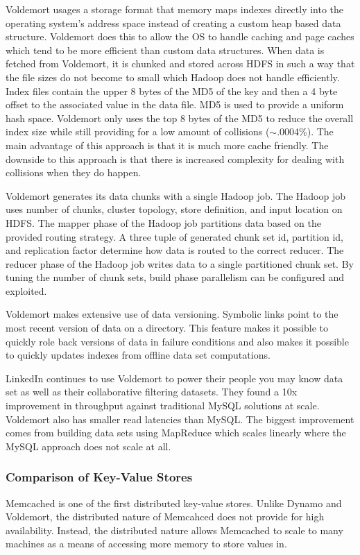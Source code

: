 \documentclass[]{article}
\begin{document}
Voldemort usages a storage format that memory maps indexes directly into the operating system's address space instead of creating a custom heap based data structure. Voldemort does this to allow the OS to handle caching and page caches which tend to be more efficient than custom data structures. When data is fetched from Voldemort, it is chunked and stored across HDFS in such a way that the file sizes do not become to small which Hadoop does not handle efficiently. Index files contain the upper 8 bytes of the MD5 of the key and then a 4 byte offset to the associated value in the data file. MD5 is used to provide a uniform hash space. Voldemort only uses the top 8 bytes of the MD5 to reduce the overall index size while still providing for a low amount of collisions ($\sim$.0004\%). The main advantage of this approach is that it is much more cache friendly. The downside to this approach is that there is increased complexity for dealing with collisions when they do happen.

Voldemort generates its data chunks with a single Hadoop job. The Hadoop job uses number of chunks, cluster topology, store definition, and input location on HDFS. The mapper phase of the Hadoop job partitions data based on the provided routing strategy. A three tuple of generated chunk set id, partition id, and replication factor determine how data is routed to the correct reducer. The reducer phase of the Hadoop job writes data to a single partitioned chunk set. By tuning the number of chunk sets, build phase parallelism can be configured and exploited.

Voldemort makes extensive use of data versioning. Symbolic links point to the most recent version of data on a directory. This feature makes it possible to quickly role back versions of data in failure conditions and also makes it possible to quickly updates indexes from offline data set computations.

LinkedIn continues to use Voldemort to power their people you may know data set as well as their collaborative filtering datasets. They found a 10x improvement in throughput against traditional MySQL solutions at scale. Voldemort also has smaller read latencies than MySQL. The biggest improvement comes from building data sets using MapReduce which scales linearly where the MySQL approach does not scale at all.

\subsubsection{Comparison of Key-Value Stores}
Memcached is one of the first distributed key-value stores. Unlike Dynamo and Voldemort, the distributed nature of Memcahced does not provide for high availability. Instead, the distributed nature allows Memcached to scale to many machines as a means of accessing more memory to store values in. 
\end{document}
